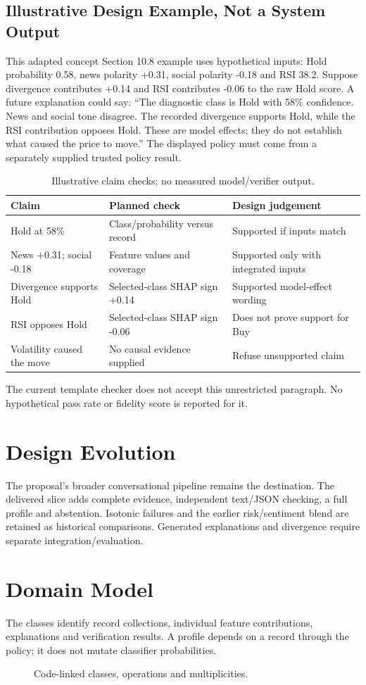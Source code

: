 \subsection{Illustrative Design Example, Not a System Output}
This adapted concept Section 10.8 example uses hypothetical inputs: Hold probability 0.58, news polarity +0.31, social polarity -0.18 and RSI 38.2. Suppose divergence contributes +0.14 and RSI contributes -0.06 to the raw Hold score. A future explanation could say: ``The diagnostic class is Hold with 58\% confidence. News and social tone disagree. The recorded divergence supports Hold, while the RSI contribution opposes Hold. These are model effects; they do not establish what caused the price to move.'' The displayed policy must come from a separately supplied trusted policy result.
\begin{longtable}{p{}p{}p{}}
\caption{Illustrative claim checks; no measured model/verifier output.}\label{tab:illustrative-claims}\\\toprule Claim & Planned check & Design judgement\\\midrule
Hold at 58\% & Class/probability versus record & Supported if inputs match\\
News +0.31; social -0.18 & Feature values and coverage & Supported only with integrated inputs\\
Divergence supports Hold & Selected-class SHAP sign +0.14 & Supported model-effect wording\\
RSI opposes Hold & Selected-class SHAP sign -0.06 & Does not prove support for Buy\\
Volatility caused the move & No causal evidence supplied & Refuse unsupported claim\\
\bottomrule\end{longtable}
The current template checker does not accept this unrestricted paragraph. No hypothetical pass rate or fidelity score is reported for it.
\section{Design Evolution}
The proposal's broader conversational pipeline remains the destination. The delivered slice adds complete evidence, independent text/JSON checking, a full profile and abstention. Isotonic failures and the earlier risk/sentiment blend are retained as historical comparisons. Generated explanations and divergence require separate integration/evaluation.
\section{Domain Model}
The classes identify record collections, individual feature contributions, explanations and verification results. A profile depends on a record through the policy; it does not mutate classifier probabilities.
\begin{figure}[htbp]\centering\caption{Code-linked classes, operations and multiplicities.}\label{fig:classes}\end{figure}
